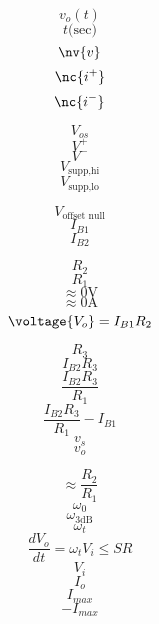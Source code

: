 \documentclass[letterpaper 12pt]{book}
\begin{document}
\[ v_o(t) \]
\[ t \text{(sec)} \]
\[ \nv{v} \]
\[ \nc{i^+} \]
\[ \nc{i^-} \]

\[ V_{os} \]
\[ V^+ \]
\[ V^- \]
\[ V_{\text{supp,hi}} \]
\[ V_{\text{supp,lo}} \]

\[ V_{\text{offset null}} \]
\[ I_{B1} \]
\[ I_{B2} \]

\[ R_2 \]
\[ R_1 \]
\[ \approx 0\mathrm{V} \]
\[ \approx 0\mathrm{A} \]
\[ \voltage{V_o} = I_{B1} R_2 \]

\[ R_3 \]
\[ I_{B2} R_3 \]
\[ \frac{I_{B2} R_3}{R_1} \]
\[  \frac{I_{B2} R_3}{R_1} - I_{B1}  \]
\[ v_s \]
\[ v_o \]

\[ \approx \frac{R_2}{R_1} \]
\[ \omega_0 \]
\[ \omega_{\text{3dB} } \]
\[ \omega_t \]
\[ \frac{dV_o}{dt} = \omega_t V_i \le SR \]
\[ V_i \]
\[ I_o \]
\[ I_{max} \]
\[ -I_{max} \]
\end{document}
